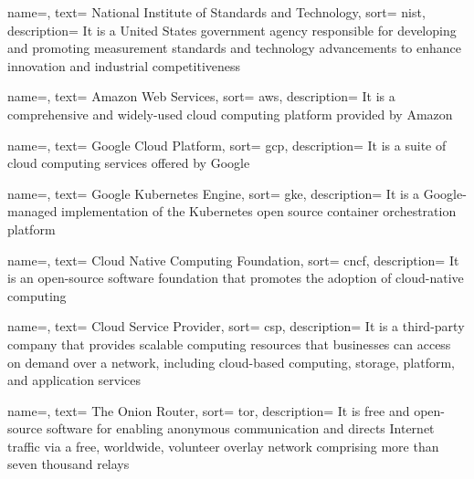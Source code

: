 {
  name=,
  text= National Institute of Standards and Technology,
  sort= nist,
  description= {It is a United States government agency responsible for developing and promoting measurement standards and technology advancements to enhance innovation and industrial competitiveness}
}

{
  name=,
  text= Amazon Web Services,
  sort= aws,
  description= {It is a comprehensive and widely-used cloud computing platform provided by Amazon}
}

{
  name=,
  text= Google Cloud Platform,
  sort= gcp,
  description= {It is a suite of cloud computing services offered by Google}
}

{
  name=,
  text= Google Kubernetes Engine,
  sort= gke,
  description= {It is a Google-managed implementation of the Kubernetes open source container orchestration platform}
}

{
  name=,
  text= Cloud Native Computing Foundation,
  sort= cncf,
  description= {It is an open-source software foundation that promotes the adoption of cloud-native computing}
}

{
  name=,
  text= Cloud Service Provider,
  sort= csp,
  description= {It is a third-party company that provides scalable computing resources that businesses can access on demand over a network, including cloud-based computing, storage, platform, and application services}
}

{
  name=,
  text= The Onion Router,
  sort= tor,
  description= {It is free and open-source software for enabling anonymous communication and directs Internet traffic via a free, worldwide, volunteer overlay network comprising more than seven thousand relays}
}

